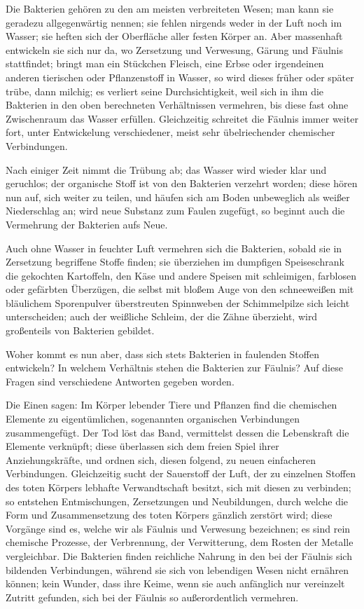 \documentclass[a4paper, 11pt, oneside, english]{article}
\begin{document}
Die Bakterien gehören zu den am meisten verbreiteten Wesen; man kann sie geradezu allgegenwärtig nennen; sie fehlen nirgends weder in der Luft noch im Wasser; sie heften sich der Oberfläche aller festen Körper an. Aber massenhaft entwickeln sie sich nur da, wo Zersetzung und Verwesung, Gärung und Fäulnis stattfindet; bringt man ein Stückchen Fleisch, eine Erbse oder irgendeinen anderen tierischen oder Pflanzenstoff in Wasser, so wird dieses früher oder später trübe, dann milchig; es verliert seine Durchsichtigkeit, weil sich in ihm die Bakterien in den oben berechneten Verhältnissen vermehren, bis diese fast ohne Zwischenraum das Wasser erfüllen. Gleichzeitig schreitet die Fäulnis immer weiter fort, unter Entwickelung verschiedener, meist sehr übelriechender chemischer Verbindungen.

Nach einiger Zeit nimmt die Trübung ab; das Wasser wird wieder klar und geruchlos; der organische Stoff ist von den Bakterien verzehrt worden; diese hören nun auf, sich weiter zu teilen, und häufen sich am Boden unbeweglich als weißer Niederschlag an; wird neue Substanz zum Faulen zugefügt, so beginnt auch die Vermehrung der Bakterien aufs Neue.

Auch ohne Wasser in feuchter Luft vermehren sich die Bakterien, sobald sie in Zersetzung begriffene Stoffe finden; sie überziehen im dumpfigen Speiseschrank die gekochten Kartoffeln, den Käse und andere Speisen mit schleimigen, farblosen oder gefärbten Überzügen, die selbst mit bloßem Auge von den schneeweißen mit bläulichem Sporenpulver überstreuten Spinnweben der Schimmelpilze sich leicht unterscheiden; auch der weißliche Schleim, der die Zähne überzieht, wird großenteils von Bakterien gebildet.

Woher kommt es nun aber, dass sich stets Bakterien in faulenden Stoffen entwickeln? In welchem Verhältnis stehen die Bakterien zur Fäulnis? Auf diese Fragen sind verschiedene Antworten gegeben worden.

Die Einen sagen: Im Körper lebender Tiere und Pflanzen find die chemischen Elemente zu eigentümlichen, sogenannten organischen Verbindungen zusammengefügt. Der Tod löst das Band, vermittelst dessen die Lebenskraft die Elemente verknüpft; diese überlassen sich dem freien Spiel ihrer Anziehungskräfte, und ordnen sich, diesen folgend, zu neuen einfacheren Verbindungen. Gleichzeitig sucht der Sauerstoff der Luft, der zu einzelnen Stoffen des toten Körpers lebhafte Verwandtschaft besitzt, sich mit diesen zu verbinden; so entstehen Entmischungen, Zersetzungen und Neubildungen, durch welche die Form und Zusammensetzung des toten Körpers gänzlich zerstört wird; diese Vorgänge sind es, welche wir als Fäulnis und Verwesung bezeichnen; es sind rein chemische Prozesse, der Verbrennung, der Verwitterung, dem Rosten der Metalle vergleichbar. Die Bakterien finden reichliche Nahrung in den bei der Fäulnis sich bildenden Verbindungen, während sie sich von lebendigen Wesen nicht ernähren können; kein Wunder, dass ihre Keime, wenn sie auch anfänglich nur vereinzelt Zutritt gefunden, sich bei der Fäulnis so außerordentlich vermehren.
\end{document}
